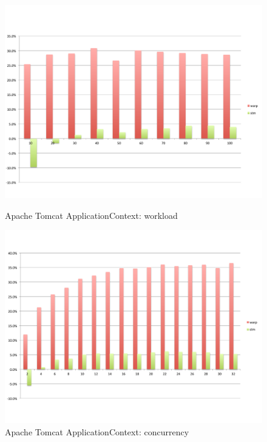 \begin{figure}
	\begin{minipage}{0.45 \textwidth}
		\includegraphics[width=\textwidth]{../../eval/32threads/case1it.pdf}
		\caption{\label{Fi:case1it}Apache Tomcat {\sf ApplicationContext}: workload}
	\end{minipage}
	\hspace{0.1 \textwidth}
	\begin{minipage}{0.45 \textwidth}
		\includegraphics[width=\textwidth]{../../eval/32threads/case1th.pdf}
				\caption{\label{Fi:case1th}Apache Tomcat {\sf ApplicationContext}: concurrency}
	\end{minipage}
	\begin{minipage}{0.45 \textwidth}

\end{minipage}
\end{figure}
